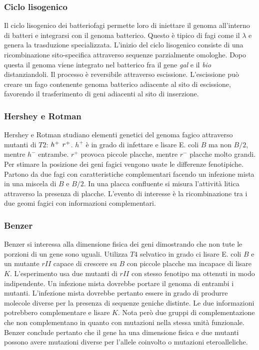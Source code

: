 		\subsubsection{Ciclo lisogenico}
		Il ciclo lisogenico dei batteriofagi permette loro di iniettare il genoma all'interno di batteri e integrarsi con il genoma batterico.
		Questo \`e tipico di fagi come il $\lambda$ e genera la trasduzione specializzata.
		L'inizio del ciclo lisogenico consiste di una ricombinazione sito-specifica attraverso sequenze parzialmente omologhe.
		Dopo questa il genoma viene integrato nel batterico fra il gene \emph{gal} e il \emph{bio} distanziandoli.
		Il processo \`e reversibile attraverso escissione.
		L'escissione pu\`o creare un fago contenente genoma batterico adiacente al sito di escissione, favorendo il trasferimento di geni adiacenti al sito di inserzione.

		\subsubsection{Hershey e Rotman}
		Hershey e Rotman studiano elementi genetici del genoma fagico attraverso mutanti di $T2$: $h^{+\-}$ $r^{+\-}$.
		$h^+$ \`e in grado di infettare e lisare E. coli $B$ ma non $B/2$, mentre $h^-$ entrambe.
		$r^+$ provoca piccole placche, mentre $r^-$ placche molto grandi.
		Per stimare la posizione dei geni fagici vengono usate le differenze fenotipiche.
		Partono da due fagi con caratteristiche complementari facendo un infezione mista in una miscela di $B$ e $B/2$.
		In una placca confluente si misura l'attivit\`a litica attraverso la presenza di placche.
		L'evento di interesse \`e la ricombinazione tra i due geomi fagici con informazioni complementari.

		\subsubsection{Benzer}
		Benzer si interessa alla dimensione fisica dei geni dimostrando che non tute le porzioni di un gene sono uguali.
		Utilizza $T4$ selvatico in grado ci lisare E. coli $B$ e un mutante $rII$ capace di crescere su $B$ con piccole placche ma incapace di lisare $K$.
		L'esperimento usa due mutanti di $rII$ con stesso fenotipo ma ottenuti in modo indipendente.
		Un infezione mista dovrebbe portare il genoma di entrambi i mutanti.
		L'infezione mista dovrebbe pertanto essere in grado di produrre molecole diverse per la presenza di sequenze geniche distinte.
		Le due informazioni potrebbero complementare e lisare $K$.
		Nota per\`o due gruppi di complementazione che non complementano in quanto con mutazioni nella stessa unit\`a funzionale.
		Benzer conclude pertanto che il gene ha una dimensione fisica e due mutanti possono avere mutazioni diverse per l'allele coinvolto o mutazioni eteroalleliche.
